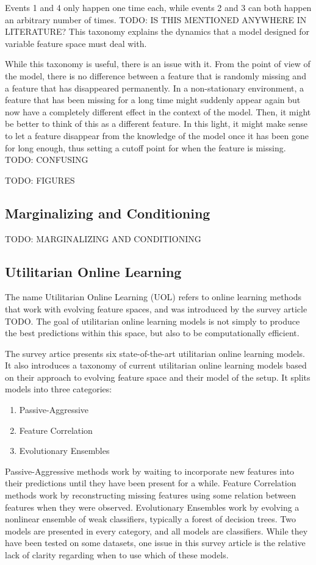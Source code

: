 Events 1 and 4 only happen one time each, while events 2 and 3 can both happen
an arbitrary number of times. TODO: IS THIS MENTIONED ANYWHERE IN LITERATURE?
This taxonomy explains the dynamics that a model designed for variable feature
space must deal with.

While this taxonomy is useful, there is an issue with it. From the point of
view of the model, there is no difference between a feature that is randomly
missing and a feature that has disappeared permanently. In a non-stationary
environment, a feature that has been missing for a long time might suddenly
appear again but now have a completely different effect in the context of the
model. Then, it might be better to think of this as a different feature. In
this light, it might make sense to let a feature disappear from the knowledge
of the model once it has been gone for long enough, thus setting a cutoff point
for when the feature is missing. TODO: CONFUSING

TODO: FIGURES

\subsection{Marginalizing and Conditioning}
TODO: MARGINALIZING AND CONDITIONING

\subsection{Utilitarian Online Learning}
The name Utilitarian Online Learning (UOL) refers to online learning methods
that work with evolving feature spaces, and was introduced by the survey
article TODO. The goal of utilitarian online learning models is not simply to
produce the best predictions within this space, but also to be computationally
efficient.

The survey artice presents six state-of-the-art utilitarian online learning
models. It also introduces a taxonomy of current utilitarian online learning
models based on their approach to evolving feature space and their model of the
setup. It splits models into three categories: 

\begin{enumerate}
  \item Passive-Aggressive
  \item Feature Correlation
  \item Evolutionary Ensembles
\end{enumerate}

Passive-Aggressive methods work by waiting to incorporate new features into
their predictions until they have been present for a while. Feature Correlation
methods work by reconstructing missing features using some relation between
features when they were observed. Evolutionary Ensembles work by evolving a
nonlinear ensemble of weak classifiers, typically a forest of decision trees.
Two models are presented in every category, and all models are classifiers.
While they have been tested on some datasets, one issue in this survey article
is the relative lack of clarity regarding when to use which of these models.

